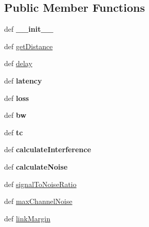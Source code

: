\subsection*{Public Member Functions}
\begin{DoxyCompactItemize}
\item 
\hypertarget{classmininet_1_1wifiChannel_1_1channelParameters_a0022f742361108524c8d57c2ea42b83e}{def {\bfseries \-\_\-\-\_\-init\-\_\-\-\_\-}}\label{classmininet_1_1wifiChannel_1_1channelParameters_a0022f742361108524c8d57c2ea42b83e}

\item 
def \hyperlink{classmininet_1_1wifiChannel_1_1channelParameters_a1027487f6288c6256cd5b41b84b0c4c1}{get\-Distance}
\item 
def \hyperlink{classmininet_1_1wifiChannel_1_1channelParameters_a70ee0a55780d41c98d0d186aee3709f6}{delay}
\item 
\hypertarget{classmininet_1_1wifiChannel_1_1channelParameters_a3c3231b02dda6b85075f97242218106e}{def {\bfseries latency}}\label{classmininet_1_1wifiChannel_1_1channelParameters_a3c3231b02dda6b85075f97242218106e}

\item 
\hypertarget{classmininet_1_1wifiChannel_1_1channelParameters_a9599d6596c89d6130c58f1312f6f1b9b}{def {\bfseries loss}}\label{classmininet_1_1wifiChannel_1_1channelParameters_a9599d6596c89d6130c58f1312f6f1b9b}

\item 
\hypertarget{classmininet_1_1wifiChannel_1_1channelParameters_a7638cb6bebd58fe47f119ad09c74b4dc}{def {\bfseries bw}}\label{classmininet_1_1wifiChannel_1_1channelParameters_a7638cb6bebd58fe47f119ad09c74b4dc}

\item 
\hypertarget{classmininet_1_1wifiChannel_1_1channelParameters_ae431138dda16105dbf1e80852b836522}{def {\bfseries tc}}\label{classmininet_1_1wifiChannel_1_1channelParameters_ae431138dda16105dbf1e80852b836522}

\item 
\hypertarget{classmininet_1_1wifiChannel_1_1channelParameters_a83b7428940e0e4e9b4c044e6b4244dd9}{def {\bfseries calculate\-Interference}}\label{classmininet_1_1wifiChannel_1_1channelParameters_a83b7428940e0e4e9b4c044e6b4244dd9}

\item 
\hypertarget{classmininet_1_1wifiChannel_1_1channelParameters_a53ef24ba7eb7b348828d27567b294daf}{def {\bfseries calculate\-Noise}}\label{classmininet_1_1wifiChannel_1_1channelParameters_a53ef24ba7eb7b348828d27567b294daf}

\item 
def \hyperlink{classmininet_1_1wifiChannel_1_1channelParameters_a5cf19f9a021dd989f07199ac82ddecfb}{signal\-To\-Noise\-Ratio}
\item 
def \hyperlink{classmininet_1_1wifiChannel_1_1channelParameters_a637c3980e2f615a0793a54515c1bf766}{max\-Channel\-Noise}
\item 
def \hyperlink{classmininet_1_1wifiChannel_1_1channelParameters_a33ae91a9b837bc79e5591f33bbde451d}{link\-Margin}
\end{DoxyCompactItemize}
